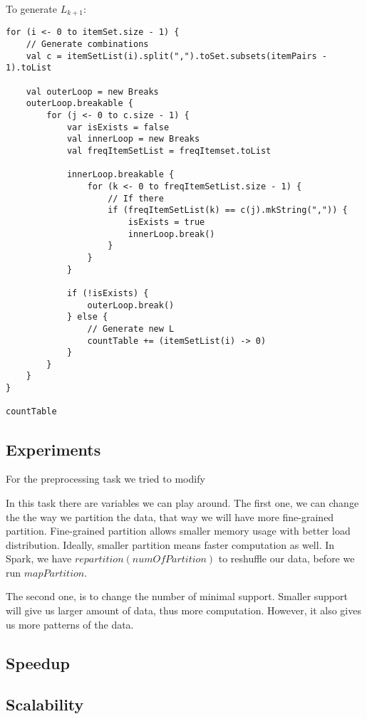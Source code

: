 \documentclass[11pt]{article}
\begin{document}
To generate $L_{k+1}$: \\

\begin{lstlisting}
for (i <- 0 to itemSet.size - 1) {
    // Generate combinations
    val c = itemSetList(i).split(",").toSet.subsets(itemPairs - 1).toList

    val outerLoop = new Breaks
    outerLoop.breakable {
        for (j <- 0 to c.size - 1) {
            var isExists = false
            val innerLoop = new Breaks
            val freqItemSetList = freqItemset.toList

            innerLoop.breakable {
                for (k <- 0 to freqItemSetList.size - 1) {
                    // If there
                    if (freqItemSetList(k) == c(j).mkString(",")) {
                        isExists = true
                        innerLoop.break()
                    }
                }
            }

            if (!isExists) {
                outerLoop.break()
            } else {
                // Generate new L
                countTable += (itemSetList(i) -> 0)
            }
        }
    }
}

countTable
\end{lstlisting}


\subsection {Experiments}

For the preprocessing task we tried to modify 

In this task there are variables we can play around.
The first one, we can change the the way we partition the data, that way we will have more fine-grained partition.
Fine-grained partition allows smaller memory usage with better load distribution.
Ideally, smaller partition means faster computation as well.
In Spark, we have $repartition(numOfPartition)$ to reshuffle our data, before we run $mapPartition$.

The second one, is to change the number of minimal support.
Smaller support will give us larger amount of data, thus more computation.
However, it also gives us more patterns of the data.

\subsection {Speedup}
\subsection {Scalability}
\end{document}
